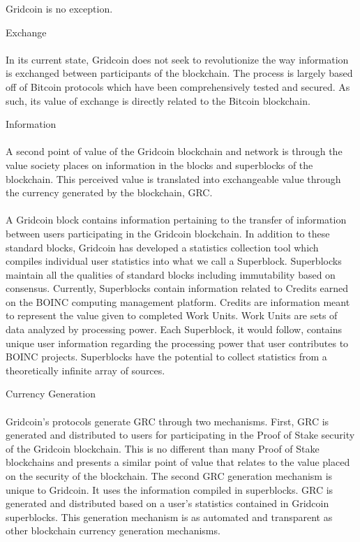 Gridcoin is no exception. \\

\begin{compactenum}
	\item Exchange
\\ \\
In its current state, Gridcoin does not seek to revolutionize the way information is exchanged between participants of the blockchain.  The process is largely based off of Bitcoin protocols which have been comprehensively tested and secured.  As such, its value of exchange is directly related to the Bitcoin blockchain.
\\
	\item Information
\\ \\
A second point of value of the Gridcoin blockchain and network is through the value society places on information in the blocks and superblocks of the blockchain.  This perceived value is translated into exchangeable value through the currency generated by the blockchain, GRC.
\\ \\
A Gridcoin block contains information pertaining to the transfer of information between users participating in the Gridcoin blockchain.  In addition to these standard blocks, Gridcoin has developed a statistics collection tool which compiles individual user statistics into what we call a  Superblock.  Superblocks maintain all the qualities of standard blocks including immutability based on consensus.  Currently, Superblocks contain information related to Credits earned on the BOINC computing management platform.  Credits are information meant to represent the value given to completed Work Units.  Work Units are sets of data analyzed by processing power.  Each Superblock, it would follow, contains unique user information regarding the processing power that user contributes to BOINC projects.  Superblocks have the potential to collect statistics from a theoretically infinite array of sources.
\\
	\item Currency Generation
\\ \\
Gridcoin’s protocols generate GRC through two mechanisms.  First, GRC is generated and distributed to users for participating in the Proof of Stake security of the Gridcoin blockchain.  This is no different than many Proof of Stake blockchains and presents a similar point of value that relates to the value placed on the security of the blockchain.  The second GRC generation mechanism is unique to Gridcoin.  It uses the information compiled in superblocks.  GRC is generated and distributed based on a user’s statistics contained in Gridcoin superblocks.  This generation mechanism is as automated and transparent as other blockchain currency generation mechanisms.

\end{compactenum}

